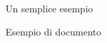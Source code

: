 \begin{frame}[fragile]{Un semplice esempio}

\begin{exampleblock}{Esempio di documento}
	
\end{exampleblock}

\end{frame}